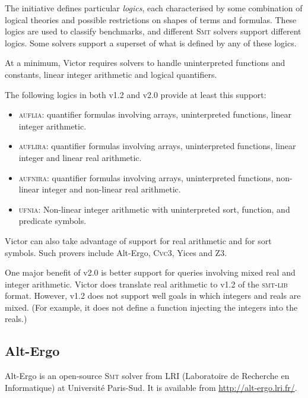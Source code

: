 \documentclass[12pt,fleqn]{article}
\newcommand{\cvcthree}{\textsc{Cvc}3}
\newcommand{\zthree}{\textsc{Z}3}
\newcommand{\yices}{Yices}
\newcommand{\smt}{\textsc{Smt}}
\newcommand{\smtlib}{\textsc{smt-lib}}
\begin{document}
The initiative defines particular \emph{logics}, each characterised by
some combination of logical theories and possible restrictions on
shapes of terms and formulas.  These logics are used to classify
benchmarks, and different \smt{} solvers support different logics.
Some solvers support a superset of what is defined by any of these
logics.

At a minimum, Victor requires solvers to handle uninterpreted
functions and constants, linear integer arithmetic and logical
quantifiers.

The following logics in both v1.2 and v2.0 provide at least this support:
\begin{itemize}
\item \textsc{auflia}: quantifier formulas involving arrays,
  uninterpreted functions, linear integer arithmetic.
\item \textsc{auflira}: quantifier formulas involving arrays,
  uninterpreted functions, linear integer and linear real arithmetic.
\item \textsc{aufnira}: quantifier formulas involving arrays,
  uninterpreted functions, non-linear integer and non-linear real
  arithmetic.
\item 
\textsc{ufnia}: Non-linear integer arithmetic with uninterpreted
  sort, function, and predicate symbols.
\end{itemize}
Victor can also take advantage of support for real arithmetic and for
sort symbols.  Such provers include Alt-Ergo, \cvcthree, \yices{} and
\zthree.

One major benefit of v2.0 is better support for queries involving
mixed real and integer arithmetic.  Victor does translate real
arithmetic to v1.2 of the \smtlib{} format. However, v1.2 does not
support well goals in which integers and reals are mixed. (For
example, it does not define a function injecting the integers into the
reals.)
  

\subsection{Alt-Ergo}

Alt-Ergo is an open-source \smt{} solver from LRI (Laboratoire de
Recherche en Informatique) at Universit\'e Paris-Sud.  It is available
from \url{http://alt-ergo.lri.fr/}.
\end{document}
